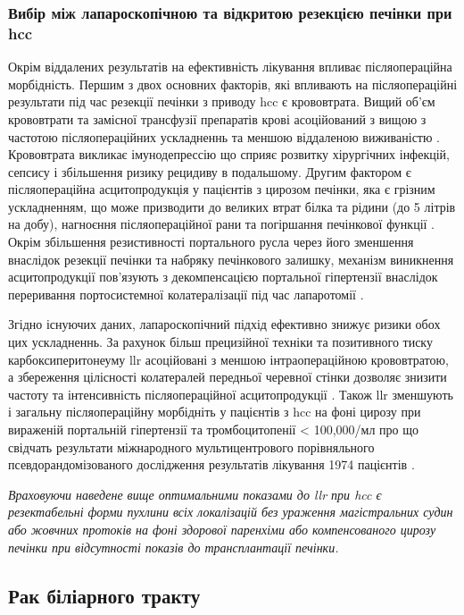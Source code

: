 \subsubsection{Вибір між лапароскопічною та відкритою резекцією печінки при \acrshort{hcc}} 
Окрім віддалених результатів на ефективність лікування впливає післяопераційна морбідність. Першим з двох основних факторів, які впливають на післяопераційні результати під час резекції печінки з приводу \acrshort{hcc} є крововтрата. Вищий об'єм крововтрати та замісної трансфузії препаратів крові асоційований з вищою з частотою післяопераційних ускладненнь та меншою віддаленою виживаністю \cite{DeBoer2007, Romano2012}. Крововтрата викликає імунодепрессію що сприяє розвитку хірургічних інфекцій, сепсису і збільшення ризику рецидиву в подальшому. Другим фактором є післяопераційна асцитопродукція у пацієнтів з цирозом печінки, яка є грізним ускладненням, що може призводити до великих втрат білка та рідини (до 5 літрів на добу), нагноєння післяопераційної рани та погіршання печінкової функції \cite{Ishii2014}. Окрім збільшення резистивності портального русла через його зменшення внаслідок резекції печінки та набряку печінкового залишку, механізм виникнення асцитопродукції пов'язують з декомпенсацією портальної гіпертензії внаслідок переривання портосистемної колатералізації під час лапаротомії \cite{Kanazawa2013}. 

Згідно існуючих даних, лапароскопічний підхід ефективно знижує ризики обох цих ускладненнь. За рахунок більш прецизійної техніки та позитивного тиску карбоксиперитонеуму \acrshort{llr} асоційовані з меншою інтраопераційною крововтратою, а збереження цілісності колатералей передньої черевної стінки дозволяє знизити частоту та інтенсивність післяопераційної асцитопродукції \cite{Truant2011}. Також \acrshort{llr} зменшують і загальну післяопераційну морбідніть у пацієнтів з \acrshort{hcc} на фоні цирозу при вираженій портальній гіпертензії та тромбоцитопенії < 100,000/мл про що свідчать результати міжнародного мультицентрового порівняльного псевдорандомізованого дослідження результатів лікування 1974 пацієнтів \cite{Ruzzenente2020}.

\emph{Враховуючи наведене вище оптимальними показами до \acrshort{llr} при \acrshort{hcc} є резектабельні форми пухлини всіх локалізацій без ураження магістральних судин або жовчних протоків на фоні здорової паренхіми або компенсованого цирозу печінки при відсутності показів до трансплантації печінки.}

\subsection{Рак біліарного тракту}

